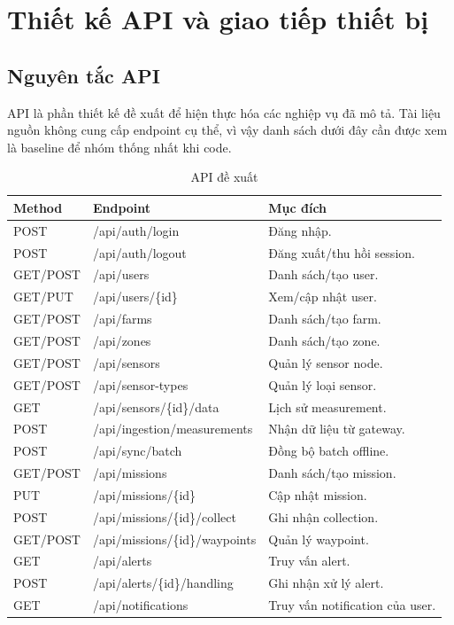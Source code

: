 
\chapter{Thiết kế API và giao tiếp thiết bị}

\section{Nguyên tắc API}
API là phần thiết kế đề xuất để hiện thực hóa các nghiệp vụ đã mô tả. Tài liệu nguồn không cung cấp endpoint cụ thể, vì vậy danh sách dưới đây cần được xem là baseline để nhóm thống nhất khi code.

\begin{longtable}{p{2cm}p{5cm}p{6cm}}
\caption{API đề xuất}\label{tab:api}\\
\toprule
Method & Endpoint & Mục đích \\
\midrule
POST & /api/auth/login & Đăng nhập.\\
POST & /api/auth/logout & Đăng xuất/thu hồi session.\\
GET/POST & /api/users & Danh sách/tạo user.\\
GET/PUT & /api/users/\{id\} & Xem/cập nhật user.\\
GET/POST & /api/farms & Danh sách/tạo farm.\\
GET/POST & /api/zones & Danh sách/tạo zone.\\
GET/POST & /api/sensors & Quản lý sensor node.\\
GET/POST & /api/sensor-types & Quản lý loại sensor.\\
GET & /api/sensors/\{id\}/data & Lịch sử measurement.\\
POST & /api/ingestion/measurements & Nhận dữ liệu từ gateway.\\
POST & /api/sync/batch & Đồng bộ batch offline.\\
GET/POST & /api/missions & Danh sách/tạo mission.\\
PUT & /api/missions/\{id\} & Cập nhật mission.\\
POST & /api/missions/\{id\}/collect & Ghi nhận collection.\\
GET/POST & /api/missions/\{id\}/waypoints & Quản lý waypoint.\\
GET & /api/alerts & Truy vấn alert.\\
POST & /api/alerts/\{id\}/handling & Ghi nhận xử lý alert.\\
GET & /api/notifications & Truy vấn notification của user.\\
\bottomrule
\end{longtable}

